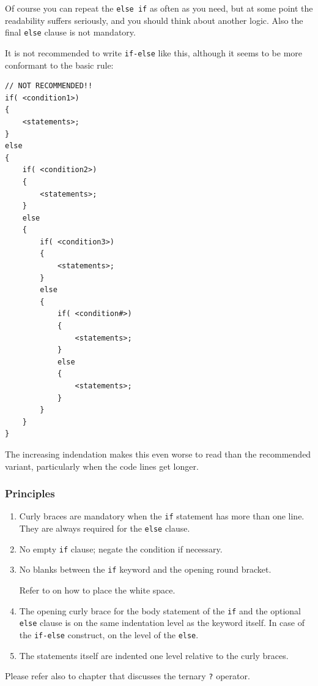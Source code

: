 Of course you can repeat the \lstinline|else if| as often as you need, but at some point the readability suffers seriously, and you should think about another logic. Also the final \lstinline|else| clause is not mandatory.

It is not recommended to write \texttt{if-else} like this, although it seems to be more conformant to the basic rule:
\begin{lstlisting}
// NOT RECOMMENDED!!
if( <condition1>)
{
    <statements>;
}
else 
{
    if( <condition2>)
    {
        <statements>;
    }
    else 
    {
        if( <condition3>)
        {
            <statements>;
        }
        else 
        {
            if( <condition#>)
            {
                <statements>;
            }
            else
            {
                <statements>;
            }
        }
    }
}        
\end{lstlisting}

The increasing indendation makes this even worse to read than the recommended variant, particularly when the code lines get longer.

\subsubsection{Principles}
\begin{enumerate}[label=P\arabic*.]
\item{Curly braces are mandatory when the \lstinline|if| statement has more than one line. They are always required for the \lstinline|else| clause.}
\item{No empty \lstinline|if| clause; negate the condition if necessary.}
\item{No blanks between the \lstinline|if| keyword and the opening round bracket. 

Refer to  on how to place the white space.}
\item{The opening curly brace for the body statement of the \lstinline|if| and the optional \lstinline|else| clause is on the same indentation level as the keyword itself. In case of the \texttt{if-else} construct, on the level of the \lstinline|else|.}
\item{The statements itself are indented one level relative to the curly braces.}
\end{enumerate}

Please refer also to chapter  that discusses the ternary \texttt{?} operator.

